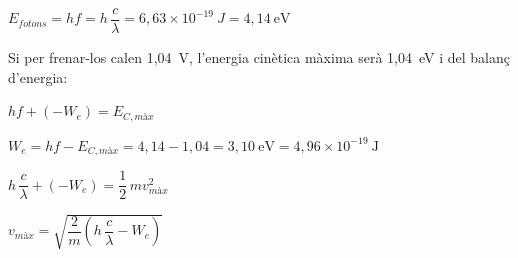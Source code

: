 \begin{solapartat}
 $E_{\textit{fotons}} = hf = h\,\dfrac{c}{\lambda} = 6,63\times 10^{-19}\ J = 4,14\ \mathrm{eV}$

\smallskip
Si per frenar-los calen 1,04~V, l'energia cinètica màxima serà 1,04~eV i del balanç d'energia:

\smallskip
{} $hf + (-W_e) = E_{C,\textit{màx}}$

\smallskip
{} $W_e = hf - E_{C,\textit{màx}} = 4,14 - 1,04 = 3,10\ \mathrm{eV} = 4,96\times 10^{-19}\ \mathrm{J}$ \quad{}
\end{solapartat}

\begin{solapartat}
 $h\,\dfrac{c}{\lambda} + (-W_e) = \dfrac{1}{2}\,m v_{\textit{màx}}^2$

\smallskip
{} $v_{\textit{màx}} = \sqrt{\dfrac{2}{m}\left(h\,\dfrac{c}{\lambda} - W_e\right)}$
\end{solapartat}
